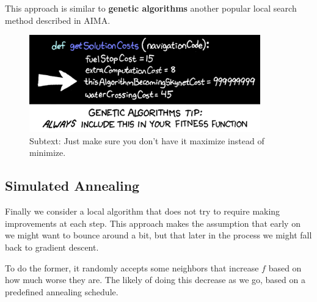 \documentclass[11pt]{article}
\begin{document}
\begin{algorithm}[h]
\begin{algorithmic}[1]
  
  \EndFor
  \EndIf{}
  \EndFor{}
  \EndFor{}
  \EndFor{}
  \EndFor{}
  \EndProcedure{}
\end{algorithmic}
\end{algorithm}

This approach is similar to \textbf{genetic algorithms} another popular local search method described in AIMA.

\begin{figure}[h]
  \centering
  \includegraphics[width=10cm]{genetic_algorithms}
  \caption{Subtext: Just make sure you don't have it maximize instead of minimize.}
\end{figure}

\subsection{Simulated Annealing}

Finally we consider a local algorithm that does not try to require making improvements at each step. This approach makes the assumption that early on we might want to bounce around a bit, but that later in the process we might fall back to gradient descent. 

To do the former, it randomly accepts some neighbors that increase $f$ based on how much worse they are. The likely of doing this decrease as we go, based on a predefined annealing schedule.
\end{document}
